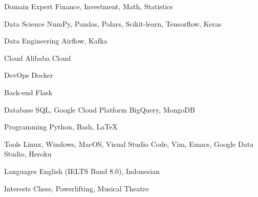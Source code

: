 

\begin{cvskills}

  \cvskill
    {Domain Expert} %
    {Finance, Investment, Math, Statistics} %

  \cvskill
    {Data Science} %
    {NumPy, Pandas, Polars, Scikit-learn, Tensorflow, Keras} %

  \cvskill
    {Data Engineering} %
    {Airflow, Kafka} %

  \cvskill
    {Cloud} %
    {Alibaba Cloud} %

  \cvskill
    {DevOps} %
    {Docker} %

  \cvskill
    {Back-end} %
    {Flask} %

  \cvskill
    {Database} %
    {SQL, Google Cloud Platform BigQuery, MongoDB} %

  \cvskill
    {Programming} %
    {Python, Bash, LaTeX} %

  \cvskill
    {Tools} %
    {Linux, Windows, MacOS, Visual Studio Code, Vim, Emacs, Google Data Studio, Heroku} %

  \cvskill
    {Languages} %
    {English (IELTS Band 8.0), Indonesian} %

  \cvskill
    {Interests} %
    {Chess, Powerlifting, Musical Theatre} %

\end{cvskills}
